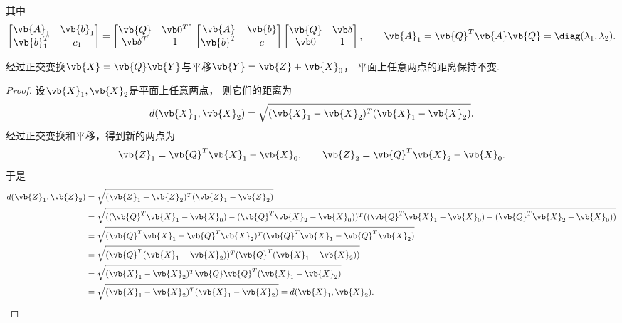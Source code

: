其中\[
	\begin{bmatrix}
		\vb{A}_1 & \vb{b}_1 \\
		\vb{b}_1^T & c_1
	\end{bmatrix}
	= \begin{bmatrix}
		\vb{Q} & \vb0^T \\
		\vb\delta^T & 1
	\end{bmatrix}
	\begin{bmatrix}
		\vb{A} & \vb{b} \\
		\vb{b}^T & c
	\end{bmatrix}
	\begin{bmatrix}
		\vb{Q} & \vb\delta \\
		\vb0 & 1
	\end{bmatrix},
	\qquad
	\vb{A}_1
	= \vb{Q}^T \vb{A} \vb{Q}
	= \diag(\lambda_1,\lambda_2).
\]

\begin{lemma}
经过正交变换\(\vb{X} = \vb{Q} \vb{Y}\)与平移\(\vb{Y} = \vb{Z} + \vb{X}_0\)，
平面上任意两点的距离保持不变.
\begin{proof}
设\(\vb{X}_1,\vb{X}_2\)是平面上任意两点，
则它们的距离为\[
	d(\vb{X}_1,\vb{X}_2)
	= \sqrt{(\vb{X}_1-\vb{X}_2)^T(\vb{X}_1-\vb{X}_2)}.
\]
经过正交变换和平移，得到新的两点为\[
	\vb{Z}_1 = \vb{Q}^T \vb{X}_1 - \vb{X}_0,
	\qquad
	\vb{Z}_2 = \vb{Q}^T \vb{X}_2 - \vb{X}_0.
\]
于是\begin{align*}
	d(\vb{Z}_1,\vb{Z}_2)
	&= \sqrt{(\vb{Z}_1-\vb{Z}_2)^T(\vb{Z}_1-\vb{Z}_2)} \\
	&= \sqrt{
		((\vb{Q}^T \vb{X}_1 - \vb{X}_0) - (\vb{Q}^T \vb{X}_2 - \vb{X}_0))^T
		((\vb{Q}^T \vb{X}_1 - \vb{X}_0) - (\vb{Q}^T \vb{X}_2 - \vb{X}_0))
	} \\
	&= \sqrt{
		(\vb{Q}^T \vb{X}_1 - \vb{Q}^T \vb{X}_2)^T
		(\vb{Q}^T \vb{X}_1 - \vb{Q}^T \vb{X}_2)
	} \\
	&= \sqrt{
		(\vb{Q}^T (\vb{X}_1 - \vb{X}_2))^T
		(\vb{Q}^T (\vb{X}_1 - \vb{X}_2))
	} \\
	&= \sqrt{
		(\vb{X}_1 - \vb{X}_2)^T
		\vb{Q} \vb{Q}^T
		(\vb{X}_1 - \vb{X}_2)
	} \\
	&= \sqrt{
		(\vb{X}_1 - \vb{X}_2)^T
		(\vb{X}_1 - \vb{X}_2)
	}
	= d(\vb{X}_1,\vb{X}_2).
	\qedhere
\end{align*}
\end{proof}
\end{lemma}

